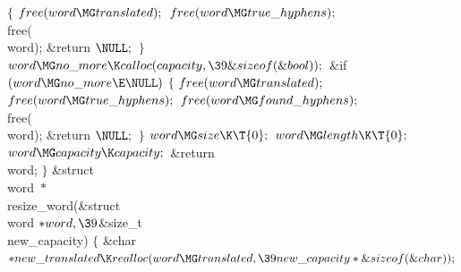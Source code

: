 ${}\{{}$\1\6
${}\\{free}(\\{word}\MG\\{translated});{}$\6
${}\\{free}(\\{word}\MG\\{true\_hyphens});{}$\6
\\{free}(\\{word});\6
\&{return} ${}\NULL;{}$\6
\4${}\}{}$\2\6
${}\\{word}\MG\\{no\_more}\K\\{calloc}(\\{capacity},\39\&{sizeof}(%
\&{bool}));{}$\6
\&{if} ${}(\\{word}\MG\\{no\_more}\E\NULL){}$\5
${}\{{}$\1\6
${}\\{free}(\\{word}\MG\\{translated});{}$\6
${}\\{free}(\\{word}\MG\\{true\_hyphens});{}$\6
${}\\{free}(\\{word}\MG\\{found\_hyphens});{}$\6
\\{free}(\\{word});\6
\&{return} ${}\NULL;{}$\6
\4${}\}{}$\2\6
${}\\{word}\MG\\{size}\K\T{0};{}$\6
${}\\{word}\MG\\{length}\K\T{0};{}$\6
${}\\{word}\MG\\{capacity}\K\\{capacity};{}$\6
\&{return} \\{word};\6
\4${}\}{}$\2\7
\1\1\&{struct} \\{word} ${}{*}{}$\\{resize\_word}(\&{struct} \\{word} ${}{*}%
\\{word},\39{}$\&{size\_t} \\{new\_capacity})\2\2\6
${}\{{}$\1\6
\&{char} ${}{*}\\{new\_translated}\K\\{realloc}(\\{word}\MG\\{translated},\39%
\\{new\_capacity}*\&{sizeof}(\&{char}));{}$\7
